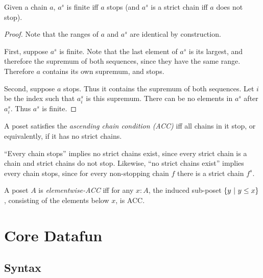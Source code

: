 \documentclass{rntz}
\begin{document}
\begin{lemma}
  Given a chain $a$, $a^s$ is finite iff $a$ stops (and $a^s$ is a strict chain
  iff $a$ does not stop).
\end{lemma}
\begin{proof}
  Note that the ranges of $a$ and $a^s$ are identical by construction.

  First, suppose $a^s$ is finite. Note that the last element of $a^s$ is its
  largest, and therefore the supremum of both sequences, since they have the
  same range. Therefore $a$ contains its own supremum, and stops.

  Second, suppose $a$ stops. Thus it contains the supremum of both sequences.
  Let $i$ be the index such that $a^s_i$ is this supremum. There can be no
  elements in $a^s$ after $a^s_i$. Thus $a^s$ is finite.
\end{proof}

\begin{definition}[ACC]
  A poset satisfies the \emph{ascending chain condition (ACC)} iff all chains in
  it stop, or equivalently, if it has no strict chains.
\end{definition}

``Every chain stops'' implies no strict chains exist, since every strict chain
is a chain and strict chains do not stop. Likewise, ``no strict chains exist''
implies every chain stops, since for every non-stopping chain $f$ there is a
strict chain $f^s$.

\begin{definition}
  A poset $A$ is \emph{elementwise-ACC} iff for any $x : A$, the induced
  sub-poset $\{{{y}~|~{y \le x}}\}$, consisting of the elements below $x$, is ACC.
\end{definition}


\section{Core Datafun}

\subsection{Syntax}
\end{document}
